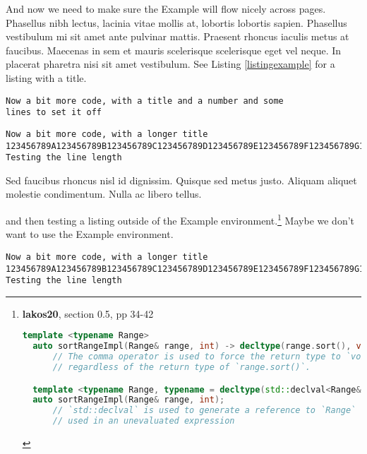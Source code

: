 \begin{leftbar}
{And now we need to make sure the Example will flow nicely across pages.  Phasellus nibh lectus, lacinia vitae mollis at, lobortis lobortis sapien. Phasellus vestibulum mi sit amet ante pulvinar mattis. Praesent rhoncus iaculis metus at faucibus. Maecenas in sem et mauris scelerisque scelerisque eget vel neque. In placerat pharetra nisi sit amet vestibulum. See Listing \ref{listingexample} for a listing with a title. 
\begin{lstlisting}[caption={This is the Listing Title.},label={listingexample},frame=tb]
Now a bit more code, with a title and a number and some
lines to set it off             
\end{lstlisting}
\begin{lstlisting}[caption={And if the title is long enough to run over two lines, then it is set flushleft rather than centered.},label={listingexample},frame=tb]
Now a bit more code, with a longer title 
123456789A123456789B123456789C123456789D123456789E123456789F123456789G123456789H
Testing the line length           
\end{lstlisting}
Sed faucibus rhoncus nisl id dignissim. Quisque sed metus justo. Aliquam aliquet molestie condimentum. Nulla ac libero tellus. }
\end{leftbar}
and then testing a listing outside of the Example environment.\cprotect\footnote{\textbf{lakos20},
  section 0.5, pp 34-42

 \begin{lstlisting}[language=C++, label={ testlabel },basicstyle={\footnotesize\tt}]
  template <typename Range>
  auto sortRangeImpl(Range& range, int) -> decltype(range.sort(), void());
      // The comma operator is used to force the return type to `void`,
      // regardless of the return type of `range.sort()`.

  template <typename Range, typename = decltype(std::declval<Range&>().sort()>
  auto sortRangeImpl(Range& range, int);
      // `std::declval` is used to generate a reference to `Range` that can be
      // used in an unevaluated expression
  \end{lstlisting}
      } Maybe we don't want to use the Example environment. 
\begin{lstlisting}[caption={Caption.},label={listingexample},frame=tb]
Now a bit more code, with a longer title 
123456789A123456789B123456789C123456789D123456789E123456789F123456789G123456789H
Testing the line length           
\end{lstlisting}

